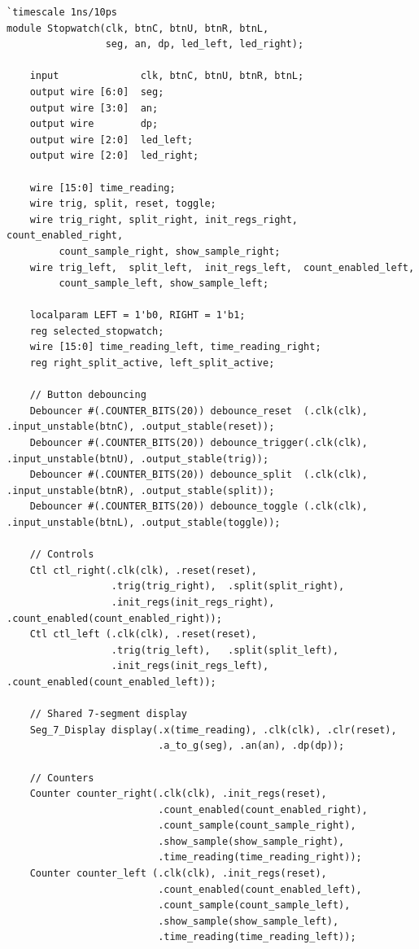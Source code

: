 \documentclass[11pt,a4paper]{article}
\begin{document}
\begin{lstlisting}
`timescale 1ns/10ps
module Stopwatch(clk, btnC, btnU, btnR, btnL,
                 seg, an, dp, led_left, led_right);

    input              clk, btnC, btnU, btnR, btnL;
    output wire [6:0]  seg;
    output wire [3:0]  an;
    output wire        dp;
    output wire [2:0]  led_left;
    output wire [2:0]  led_right;

    wire [15:0] time_reading;
    wire trig, split, reset, toggle;
    wire trig_right, split_right, init_regs_right, count_enabled_right,
         count_sample_right, show_sample_right;
    wire trig_left,  split_left,  init_regs_left,  count_enabled_left,
         count_sample_left, show_sample_left;

    localparam LEFT = 1'b0, RIGHT = 1'b1;
    reg selected_stopwatch;
    wire [15:0] time_reading_left, time_reading_right;
    reg right_split_active, left_split_active;

    // Button debouncing
    Debouncer #(.COUNTER_BITS(20)) debounce_reset  (.clk(clk), .input_unstable(btnC), .output_stable(reset));
    Debouncer #(.COUNTER_BITS(20)) debounce_trigger(.clk(clk), .input_unstable(btnU), .output_stable(trig));
    Debouncer #(.COUNTER_BITS(20)) debounce_split  (.clk(clk), .input_unstable(btnR), .output_stable(split));
    Debouncer #(.COUNTER_BITS(20)) debounce_toggle (.clk(clk), .input_unstable(btnL), .output_stable(toggle));

    // Controls
    Ctl ctl_right(.clk(clk), .reset(reset),
                  .trig(trig_right),  .split(split_right),
                  .init_regs(init_regs_right), .count_enabled(count_enabled_right));
    Ctl ctl_left (.clk(clk), .reset(reset),
                  .trig(trig_left),   .split(split_left),
                  .init_regs(init_regs_left),  .count_enabled(count_enabled_left));

    // Shared 7-segment display
    Seg_7_Display display(.x(time_reading), .clk(clk), .clr(reset),
                          .a_to_g(seg), .an(an), .dp(dp));

    // Counters
    Counter counter_right(.clk(clk), .init_regs(reset),
                          .count_enabled(count_enabled_right),
                          .count_sample(count_sample_right),
                          .show_sample(show_sample_right),
                          .time_reading(time_reading_right));
    Counter counter_left (.clk(clk), .init_regs(reset),
                          .count_enabled(count_enabled_left),
                          .count_sample(count_sample_left),
                          .show_sample(show_sample_left),
                          .time_reading(time_reading_left));


\end{lstlisting}
\end{document}
